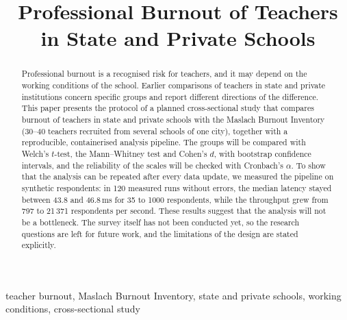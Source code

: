 \documentclass[conference]{IEEEtran}
\begin{document}
\title{Professional Burnout of Teachers\\
in State and Private Schools}

\author{
\and
{}
}

\maketitle

\begin{abstract}
Professional burnout is a recognised risk for teachers, and it may depend on the working conditions of the school.
Earlier comparisons of teachers in state and private institutions concern specific groups and report different directions of the difference.
This paper presents the protocol of a planned cross-sectional study that compares burnout of teachers in state and private schools
with the Maslach Burnout Inventory (30--40 teachers recruited from several schools of one city), together with a reproducible, containerised analysis pipeline.
The groups will be compared with Welch's $t$-test, the Mann--Whitney test and Cohen's $d$, with bootstrap confidence intervals, and the reliability of the scales will be checked with Cronbach's $\alpha$.
To show that the analysis can be repeated after every data update, we measured the pipeline on synthetic respondents:
in 120 measured runs without errors, the median latency stayed between 43.8 and 46.8\,ms for 35 to 1000 respondents,
while the throughput grew from 797 to 21\,371 respondents per second.
These results suggest that the analysis will not be a bottleneck.
The survey itself has not been conducted yet, so the research questions are left for future work, and the limitations of the design are stated explicitly.
\end{abstract}

\begin{IEEEkeywords}
teacher burnout, Maslach Burnout Inventory, state and private schools, working conditions, cross-sectional study
\end{IEEEkeywords}








\end{document}
